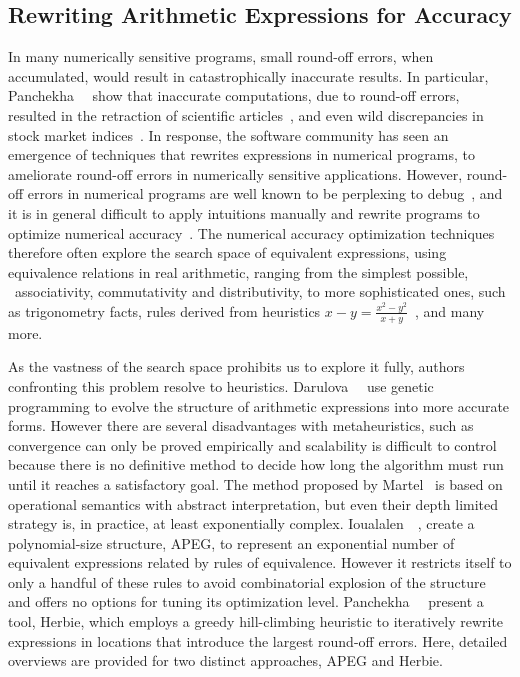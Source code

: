 
\subsection{Rewriting Arithmetic Expressions for Accuracy}
\label{bg:sub:expression_accuracy}

In many numerically sensitive programs, small round-off errors, when
accumulated, would result in catastrophically inaccurate results.  In
particular, Panchekha~\etal~\cite{panchekha15} show that inaccurate
computations, due to round-off errors, resulted in the retraction of scientific
articles~\cite{altman99}, and even wild discrepancies in stock market
indices~\cite{mccullough99}.  In response, the software community has seen an
emergence of techniques that rewrites expressions in numerical programs, to
ameliorate round-off errors in numerically sensitive applications.  However,
round-off errors in numerical programs are well known to be perplexing to
debug~\cite{toronto14}, and it is in general difficult to apply intuitions
manually and rewrite programs to optimize numerical accuracy~\cite{toronto14}.
The numerical accuracy optimization techniques therefore often explore the
search space of equivalent expressions, using equivalence relations in
real arithmetic, ranging from the simplest possible, \eg~associativity,
commutativity and distributivity, to more sophisticated ones, such as
trigonometry facts, rules derived from heuristics $x - y = \frac{x^2 - y^2}{x
+ y}$~\cite{panchekha15}, and many more.

As the vastness of the search space prohibits us to explore it fully, authors
confronting this problem resolve to heuristics.  Darulova~\etal~\cite{darulova}
use genetic programming to evolve the structure of arithmetic expressions
into more accurate forms.  However there are several disadvantages with
metaheuristics, such as convergence can only be proved empirically and
scalability is difficult to control because there is no definitive method to
decide how long the algorithm must run until it reaches a satisfactory goal.
The method proposed by Martel~\cite{martel07} is based on operational semantics
with abstract interpretation, but even their depth limited strategy is, in
practice, at least exponentially complex.  Ioualalen~\etal~\cite{ioualalen},
create a polynomial-size structure, APEG, to represent an exponential number of
equivalent expressions related by rules of equivalence.  However it restricts
itself to only a handful of these rules to avoid combinatorial explosion
of the structure and offers no options for tuning its optimization level.
Panchekha~\etal~\cite{panchekha15} present a tool, Herbie, which employs a
greedy hill-climbing heuristic to iteratively rewrite expressions in locations
that introduce the largest round-off errors.  Here, detailed overviews are
provided for two distinct approaches, APEG and Herbie.

